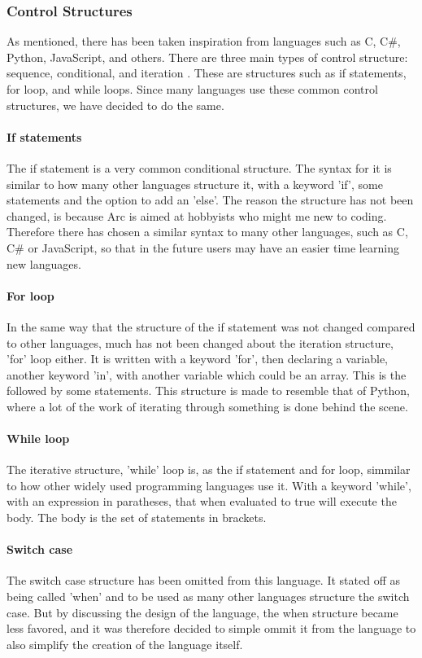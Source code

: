 \subsubsection{Control Structures}
As mentioned, there has been taken inspiration from languages such as C, C\#, Python, JavaScript, and others. There are three main types of control structure: sequence, conditional, and iteration \cite*{CBook}. These are structures such as if statements, for loop, and while loops. Since many languages use these common control structures, we have decided to do the same.

\paragraph*{If statements}
The if statement is a very common conditional structure. The syntax for it is similar to how many other languages structure it, with a keyword 'if', some statements and the option to add an 'else'. The reason the structure has not been changed, is because Arc is aimed at hobbyists who might me new to coding. Therefore there has chosen a similar syntax to many other languages, such as C, C\# or JavaScript, so that in the future users may have an easier time learning new languages.

\paragraph*{For loop}
In the same way that the structure of the if statement was not changed compared to other languages, much has not been changed about the iteration structure, 'for' loop either. It is written with a keyword 'for', then declaring a variable, another keyword 'in', with another variable which could be an array. This is the followed by some statements.
This structure is made to resemble that of Python, where a lot of the work of iterating through something is done behind the scene.

\paragraph*{While loop}
The iterative structure, 'while' loop is, as the if statement and for loop, simmilar to how other widely used programming languages use it. With a keyword 'while', with an expression in paratheses, that when evaluated to true will execute the body. The body is the set of statements in brackets. 

\paragraph*{Switch case}
The switch case structure has been omitted from this language. It stated off as being called 'when' and to be used as many other languages structure the switch case. But by discussing the design of the language, the when structure became less favored, and it was therefore decided to simple ommit it from the language to also simplify the creation of the language itself.
